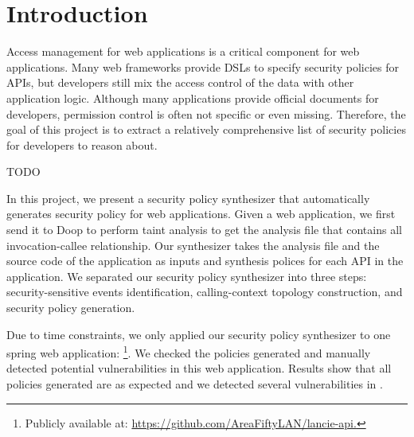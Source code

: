 \section{Introduction}%


Access management for web applications is a critical component for web
applications.
Many web frameworks provide DSLs to specify security policies for APIs, but
developers still mix the access control of the data with other application
logic.
Although many applications provide official documents for developers,
permission control is often not specific or even missing.
%
Therefore, the goal of this project is to extract a relatively comprehensive
list of security policies for developers to reason about.

TODO

In this project, we present a security policy synthesizer that automatically
generates security policy for web applications.
%
Given a web application, we first send it to Doop to perform taint analysis to
get the analysis file that contains all invocation-callee relationship.
%
Our synthesizer takes the analysis file and the source code of the application
as inputs and synthesis polices for each API in the application.
%
We separated our security policy synthesizer into three steps:
security-sensitive events identification, calling-context topology construction,
and security policy generation.

Due to time constraints, we only applied our security policy synthesizer to one
spring web application: \lancie\footnote{Publicly available at:
  \url{https://github.com/AreaFiftyLAN/lancie-api.}}.
%
We checked the policies generated and manually detected potential
vulnerabilities in this web application.
%
Results show that all policies generated are as expected and we detected several
vulnerabilities in \lancie.


